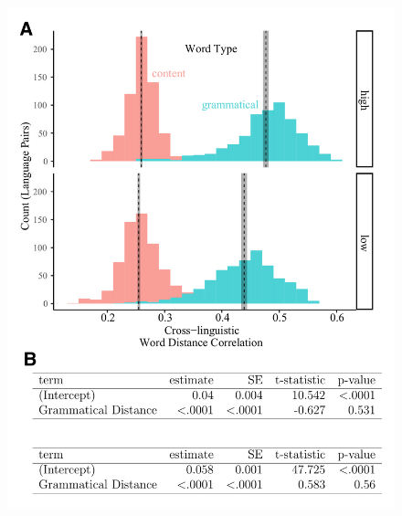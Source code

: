 \documentclass[9pt,twoside,lineno]{pnas-new}
\begin{document}
\pagebreak
\clearpage


\begin{figure}[h]
\centering
     \includegraphics[width=4.5in]{suppfigs/syntax_controlC.pdf}


\end{figure}
\end{document}
